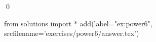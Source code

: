 
\begin{ex} 
  \label{ex:power6}
  
  \qed
\end{ex} 
\begin{python0}
from solutions import *
add(label="ex:power6",
    srcfilename='exercises/power6/answer.tex') 
\end{python0}
